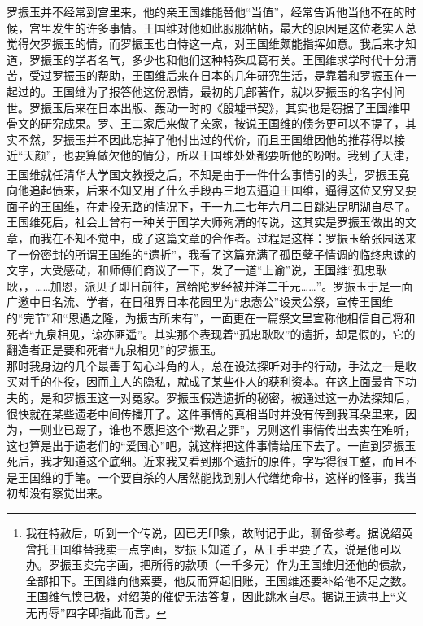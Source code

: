 罗振玉并不经常到宫里来，他的亲王国维能替他“当值”，经常告诉他当他不在的时候，宫里发生的许多事情。王国维对他如此服服帖帖，最大的原因是这位老实人总觉得欠罗振玉的情，而罗振玉也自恃这一点，对王国维颇能指挥如意。我后来才知道，罗振玉的学者名气，多少也和他们这种特殊瓜葛有关。王国维求学时代十分清苦，受过罗振玉的帮助，王国维后来在日本的几年研究生活，是靠着和罗振玉在一起过的。王国维为了报答他这份恩情，最初的几部著作，就以罗振玉的名字付问世。罗振玉后来在日本出版、轰动一时的《殷墟书契》，其实也是窃据了王国维甲骨文的研究成果。罗、王二家后来做了亲家，按说王国维的债务更可以不提了，其实不然，罗振玉并不因此忘掉了他付出过的代价，而且王国维因他的推荐得以接近“天颜”，也要算做欠他的情分，所以王国维处处都要听他的吩咐。我到了天津，王国维就任清华大学国文教授之后，不知是由于一件什么事情引的头\footnote{我在特赦后，听到一个传说，因已无印象，故附记于此，聊备参考。据说绍英曾托王国维替我卖一点字画，罗振玉知道了，从王手里要了去，说是他可以办。罗振玉卖完字画，把所得的款项（一千多元）作为王国维归还他的债款，全部扣下。王国维向他索要，他反而算起旧账，王国维还要补给他不足之数。王国维气愤已极，对绍英的催促无法答复，因此跳水自尽。据说王遗书上“义无再辱”四字即指此而言。}，罗振玉竟向他追起债来，后来不知又用了什么手段再三地去逼迫王国维，逼得这位又穷又要面子的王国维，在走投无路的情况下，于一九二七年六月二日跳进昆明湖自尽了。\\

王国维死后，社会上曾有一种关于国学大师殉清的传说，这其实是罗振玉做出的文章，而我在不知不觉中，成了这篇文章的合作者。过程是这样：罗振玉给张园送来了一份密封的所谓王国维的“遗折”，我看了这篇充满了孤臣孽子情调的临终忠谏的文字，大受感动，和师傅们商议了一下，发了一道“上谕”说，王国维“孤忠耿耿，，……加恩，派贝子即日前往，赏给陀罗经被并洋二千元……”。罗振玉于是一面广邀中日名流、学者，在日租界日本花园里为“忠悫公”设灵公祭，宣传王国维的“完节”和“恩遇之隆，为振古所未有”，一面更在一篇祭文里宣称他相信自己将和死者“九泉相见，谅亦匪遥”。其实那个表现着“孤忠耿耿”的遗折，却是假的，它的翻造者正是要和死者“九泉相见”的罗振玉。\\

那时我身边的几个最善于勾心斗角的人，总在设法探听对手的行动，手法之一是收买对手的仆役，因而主人的隐私，就成了某些仆人的获利资本。在这上面最肯下功夫的，是和罗振玉这一对冤家。罗振玉假造遗折的秘密，被通过这一办法探知后，很快就在某些遗老中间传播开了。这件事情的真相当时并没有传到我耳朵里来，因为，一则业已踢了，谁也不愿担这个“欺君之罪”，另则这件事情传出去实在难听，这也算是出于遗老们的“爱国心”吧，就这样把这件事情给压下去了。一直到罗振玉死后，我才知道这个底细。近来我又看到那个遗折的原件，字写得很工整，而且不是王国维的手笔。一个要自杀的人居然能找到别人代缮绝命书，这样的怪事，我当初却没有察觉出来。\\


